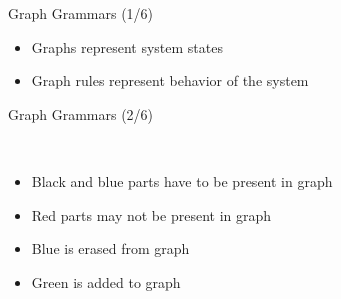 \documentclass{FMTslides}
\begin{document}
\begin{frame}{Graph Grammars (1/6)}
\begin{itemize}
  \item Graphs represent system states
  \item Graph rules represent behavior of the system
\end{itemize}

\begin{figure}
\centering
{}\hspace{10px}
\subfloat[graph]{}
\end{figure}
\end{frame}

\begin{frame}{Graph Grammars (2/6)}
\begin{figure}
\centering
  \subfloat[?coin]{}\hspace{10px}
  \subfloat[?button]{}\\
  \subfloat[!coffee]{}
\end{figure}
\begin{itemize}[<+->]
  \item Black and blue parts have to be present in graph
  \item Red parts may not be present in graph
  \item Blue is erased from graph
  \item Green is added to graph
\end{itemize}
\end{frame}
\end{document}
